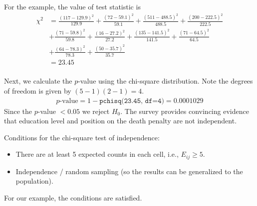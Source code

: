 \documentclass[10pt]{beamer}
\begin{document}
\begin{frame}
For the example, the value of test statistic is\\
\begin{align*}
\chi^2 &= \frac{(117-129.9)^2}{129.9} + \frac{(72-59.1)^2}{59.1} + \frac{(511-488.5)^2}{488.5} + \frac{(200-222.5)^2}{222.5}\\
&+ \frac{(71-59.8)^2}{59.8} + \frac{(16-27.2)^2}{27.2} + \frac{(135-141.5)^2}{141.5} + \frac{(71-64.5)^2}{64.5}\\
&+ \frac{(64-78.3)^2}{78.3} + \frac{(50-35.7)^2}{35.7}\\
&= \boxed{23.45}\\
\end{align*}

\end{frame}

\begin{frame}
Next, we calculate the $p$-value using the chi-square distribution.  Note the degrees of freedom is given by $(5-1)(2-1)=4$.
\begin{align*}
\text{$p$-value} = 1 - \texttt{pchisq(23.45, df=4)} = 0.0001029
\end{align*}
Since the $p$-value $< 0.05$ we reject $H_0$.  The survey provides convincing evidence that education level and position on the death penalty are not independent. 
\end{frame}

\begin{frame}
Conditions for the chi-square test of independence:
\begin{itemize}
\item There are at least 5 expected counts in each cell, i.e., $E_{ij} \geq 5$.
\item Independence / random sampling (so the results can be generalized to the population).
\end{itemize}
\vspace{10pt}

For our example, the conditions are satisfied.
\end{frame}

% 
\end{document}
